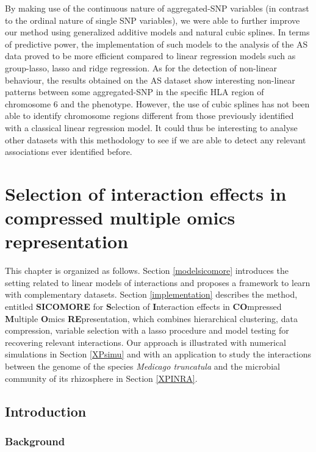 \documentclass[]{book}
\begin{document}
By making use of the continuous nature of aggregated-SNP variables (in
contrast to the ordinal nature of single SNP variables), we were able to
further improve our method using generalized additive models and natural
cubic splines. In terms of predictive power, the implementation of such
models to the analysis of the AS data proved to be more efficient
compared to linear regression models such as group-lasso, lasso and
ridge regression. As for the detection of non-linear behaviour, the
results obtained on the AS dataset show interesting non-linear patterns
between some aggregated-SNP in the specific HLA region of chromosome 6
and the phenotype. However, the use of cubic splines has not been able
to identify chromosome regions different from those previously
identified with a classical linear regression model. It could thus be
interesting to analyse other datasets with this methodology to see if we
are able to detect any relevant associations ever identified before.

\hypertarget{sicomore}{%
\chapter{Selection of interaction effects in compressed multiple omics representation}\label{sicomore}}

This chapter is organized as follows. Section \ref{modelsicomore}
introduces the setting related to linear models of interactions and
proposes a framework to learn with complementary
datasets. Section \ref{implementation} describes the method, entitled \textbf{SICOMORE} for \textbf{S}election of \textbf{I}nteraction effects in \textbf{CO}mpressed \textbf{M}ultiple \textbf{O}mics \textbf{RE}presentation,
which combines hierarchical clustering, data compression, variable selection with a lasso procedure and model testing for recovering relevant interactions.
Our approach is illustrated with numerical simulations in Section \ref{XPsimu} and with an application to study the interactions between the genome of the species \emph{Medicago truncatula} and the microbial community of its rhizosphere in Section \ref{XPINRA}.

\hypertarget{introduction-3}{%
\section{Introduction}\label{introduction-3}}

\hypertarget{background-1}{%
\subsection{Background}\label{background-1}}
\end{document}
